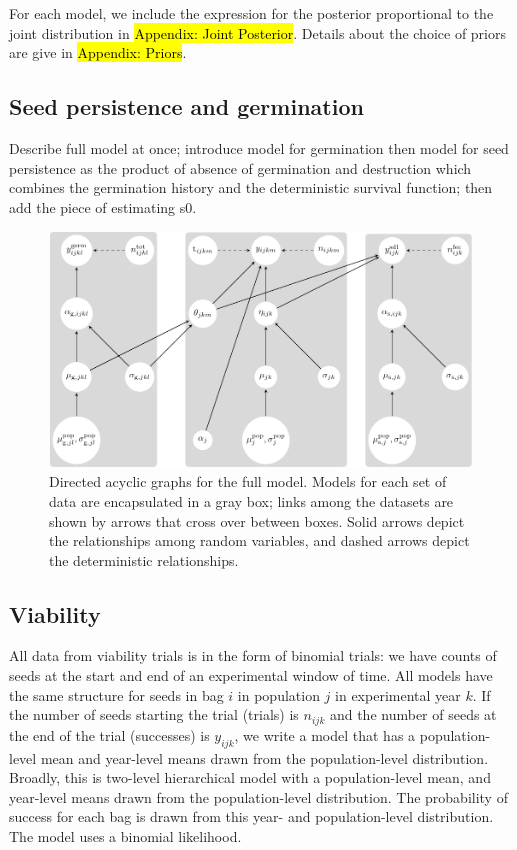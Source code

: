 \documentclass[12pt, oneside, titlepage]{article}   	%
\begin{document}
For each model, we include the expression for the posterior proportional to the joint distribution in \hl{Appendix: Joint Posterior}. Details about the choice of priors are give in \hl{Appendix: Priors}.

\subsection{Seed persistence and germination}

Describe full model at once; introduce model for germination then model for seed persistence as the product of absence of germination and destruction which combines the germination history and the deterministic survival function; then add the piece of estimating s0.

\begin{figure}[!h]
       \includegraphics[width=\textwidth]{../../manuscript/figures/dag-seed-bag.pdf}  
    \caption{ Directed acyclic graphs for the full model. Models for each set of data are encapsulated in a gray box; links among the datasets are shown by arrows that cross over between boxes. Solid arrows depict the relationships among random variables, and dashed arrows depict the deterministic relationships. }
 \label{fig:dag-seed-bag}
\end{figure}

\subsection{Viability}

All data from viability trials is in the form of binomial trials: we have counts of seeds at the start and end of an experimental window of time. All models have the same structure for seeds in bag $i$ in population $j$ in experimental year $k$. If the number of seeds starting the trial (trials) is $n_{ijk}$ and the number of seeds at the end of the trial (successes) is $y_{ijk}$, we write a model that has a population-level mean and year-level means drawn from the population-level distribution. Broadly, this is two-level hierarchical model with a population-level mean, and year-level means drawn from the population-level distribution. The probability of success for each bag is drawn from this year- and population-level distribution. The model uses a binomial likelihood. 
\end{document}
